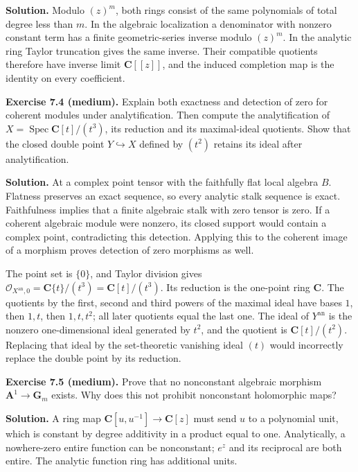 \documentclass[11pt]{article}
\begin{document}
\textbf{Solution.} Modulo \((z)^m\), both rings consist of the same
polynomials of total degree less than \(m\). In the algebraic
localization a denominator with nonzero constant term has a finite
geometric-series inverse modulo \((z)^m\). In the analytic ring Taylor
truncation gives the same inverse. Their compatible quotients therefore
have inverse limit \(\mathbf C[[z]]\), and the induced completion map is
the identity on every coefficient.

\textbf{Exercise 7.4 (medium).} Explain both exactness and detection of
zero for coherent modules under analytification. Then compute the
analytification of \(X=\operatorname{Spec}\mathbf C[t]/(t^3)\), its
reduction and its maximal-ideal quotients. Show that the closed double
point \(Y\hookrightarrow X\) defined by \((t^2)\) retains its ideal
after analytification.

\textbf{Solution.} At a complex point tensor with the faithfully flat
local algebra \(B\). Flatness preserves an exact sequence, so every
analytic stalk sequence is exact. Faithfulness implies that a finite
algebraic stalk with zero tensor is zero. If a coherent algebraic module
were nonzero, its closed support would contain a complex point,
contradicting this detection. Applying this to the coherent image of a
morphism proves detection of zero morphisms as well.

The point set is \(\{0\}\), and Taylor division gives
\(\mathcal O_{X^{\mathrm{an}},0}=\mathbf C\{t\}/(t^3)=\mathbf C[t]/(t^3)\).
Its reduction is the one-point ring \(\mathbf C\). The quotients by the
first, second and third powers of the maximal ideal have bases \(1\),
then \(1,t\), then \(1,t,t^2\); all later quotients equal the last one.
The ideal of \(Y^{\mathrm{an}}\) is the nonzero one-dimensional ideal
generated by \(t^2\), and the quotient is \(\mathbf C[t]/(t^2)\).
Replacing that ideal by the set-theoretic vanishing ideal \((t)\) would
incorrectly replace the double point by its reduction.

\textbf{Exercise 7.5 (medium).} Prove that no nonconstant algebraic
morphism \(\mathbf A^1\to\mathbf G_m\) exists. Why does this not
prohibit nonconstant holomorphic maps?

\textbf{Solution.} A ring map \(\mathbf C[u,u^{-1}]\to\mathbf C[z]\)
must send \(u\) to a polynomial unit, which is constant by degree
additivity in a product equal to one. Analytically, a nowhere-zero
entire function can be nonconstant; \(e^z\) and its reciprocal are both
entire. The analytic function ring has additional units.
\end{document}
